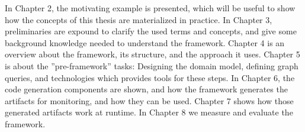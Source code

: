 In Chapter 2, the motivating example is presented, which will be useful to show how the concepts of this thesis are materialized in practice.
In Chapter 3, preliminaries are expound to clarify the used terms and concepts, and give some background knowledge needed to understand the framework.
Chapter 4 is an overview about the framework, its structure, and the approach it uses.
Chapter 5 is about the ''pre-framework'' tasks: Designing the domain model, defining graph queries, and technologies which provides tools for these steps.
In Chapter 6, the code generation components are shown, and how the framework generates the artifacts for monitoring, and how they can be used.
Chapter 7 shows how those generated artifacts work at runtime. 
In Chapter 8 we measure and evaluate the framework.

